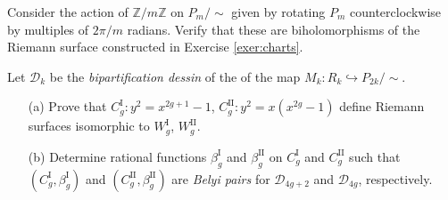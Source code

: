 \documentclass{article}
\begin{document}
\begin{exercise}\label{exer:cyclicauts}
Consider the action of $\mathbb{Z}/m\mathbb{Z}$ on $P_m/{\sim}$ given by rotating $P_m$ counterclockwise by multiples of $2\pi/m$ radians. Verify that these are biholomorphisms of the Riemann surface constructed in Exercise \ref{exer:charts}.
\end{exercise}

\begin{exercise}
Let $\mathcal{D}_k$ be the \emph{bipartification dessin} of the of the map $M_k : R_k \hookrightarrow P_{2k}/{\sim}$. 
\begin{enumerate}
    \item[(a)] Prove that $C_g^\text{I} : y^2 = x^{2g+1} - 1$, $C_g^\text{II} : y^2 = x(x^{2g} - 1)$ define Riemann surfaces isomorphic to $W_g^\text{I}$, $W_g^\text{II}$.%
    \item[(b)] Determine rational functions $\beta_g^\text{I}$ and $\beta_g^\text{II}$ on $C_g^\text{I}$ and $C_g^\text{II}$ such that $(C_g^\text{I}, \beta_g^\text{I})$ and $(C_g^\text{II}, \beta_g^\text{II})$ are \emph{Belyi pairs} for $\mathcal{D}_{4g+2}$ and $\mathcal{D}_{4g}$, respectively.
\end{enumerate}
\end{exercise}
\end{document}
